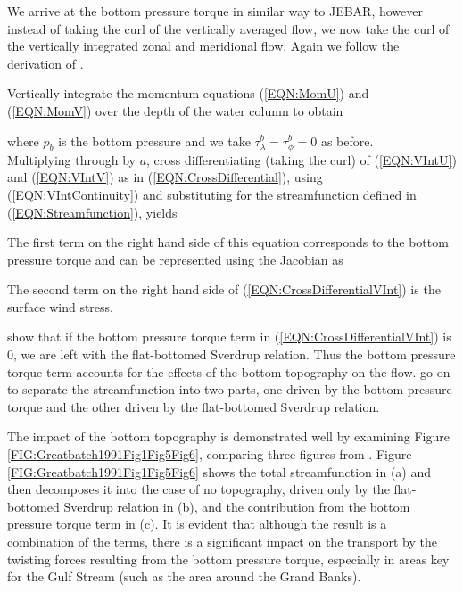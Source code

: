 \documentclass[..\report.tex]{subfiles}
\begin{document}
We arrive at the bottom pressure torque in similar way to \gls{JEBAR}, however instead of taking the curl of the vertically averaged flow, we now take the curl of the vertically integrated zonal and meridional flow.
Again we follow the derivation of \citet{Greatbatch1991}.

Vertically integrate the momentum equations (\ref{EQN:MomU}) and (\ref{EQN:MomV}) over the depth of the water column to obtain


where $p_b$ is the bottom pressure and we take $\tau_\lambda^b=\tau_\phi^b=0$ as before.\\
Multiplying through by $a$, cross differentiating (taking the curl) of (\ref{EQN:VIntU}) and (\ref{EQN:VIntV}) as in (\ref{EQN:CrossDifferential}), using (\ref{EQN:VIntContinuity}) and substituting for the streamfunction defined in (\ref{EQN:Streamfunction}), yields



The first term on the right hand side of this equation corresponds to the bottom pressure torque and can be represented using the Jacobian as


%
The second term on the right hand side of (\ref{EQN:CrossDifferentialVInt}) is the surface wind stress.

\citet{Greatbatch1991} show that if the bottom pressure torque term in (\ref{EQN:CrossDifferentialVInt}) is 0, we are left with the flat-bottomed Sverdrup relation. Thus the bottom pressure torque term accounts for the effects of the bottom topography on the flow. \citet{Greatbatch1991} go on to separate the streamfunction into two parts, one driven by the bottom pressure torque and the other driven by the flat-bottomed Sverdrup relation.
\par The impact of the bottom topography is demonstrated well by examining Figure \ref{FIG:Greatbatch1991Fig1Fig5Fig6}, comparing three figures from \citet{Greatbatch1991}. Figure \ref{FIG:Greatbatch1991Fig1Fig5Fig6} shows the total streamfunction in (a) and then decomposes it into the case of no topography, driven only by the flat-bottomed Sverdrup relation in (b), and the contribution from the bottom pressure torque term in (c). It is evident that although the result is a combination of the terms, there is a significant impact on the transport by the twisting forces resulting from the bottom pressure torque, especially in areas key for the Gulf Stream (such as the area around the Grand Banks).
\end{document}
